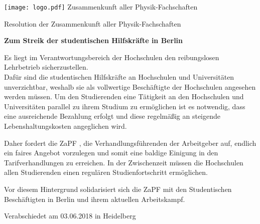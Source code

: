 \documentclass[DIV=calc]{scrartcl}
\begin{document}
    \hspace{0.87\textwidth}
    \begin{minipage}{120pt}
        \vspace{-1.8cm}
        \texttt{[image: logo.pdf]}
        \centering
        \small Zusammenkunft aller Physik-Fachschaften
    \end{minipage}
    \begin{center}
        \huge{Resolution der Zusammenkunft aller Physik-Fachschaften}\vspace{.25\baselineskip}\\
        \normalsize
    \end{center}
    \vspace{1cm} 
   \textbf{\large{Zum Streik der studentischen Hilfskräfte in Berlin}}
    

Es liegt im Verantwortungsbereich der Hochschulen den	reibungslosen
Lehrbetrieb	sicherzustellen.\\
Dafür sind die studentischen Hilfskräfte an	Hochschulen	und
Universitäten	unverzichtbar, weshalb sie als vollwertige Beschäftigte	der	Hochschulen	angesehen
werden	müssen.	Um	den	Studierenden	eine	Tätigkeit	an	den	Hochschulen	und	Universitäten	parallel
zu	ihrem	Studium	zu	ermöglichen	ist	es	notwendig,	dass	eine	ausreichende	Bezahlung	erfolgt	und
diese	regelmäßig	an	steigende	Lebenshaltungskosten	angeglichen	wird.

Daher	fordert	die	ZaPF , die Verhandlungsführenden der Arbeitgeber auf,	endlich	ein	faires	Angebot	vorzulegen	und	somit	eine
baldige	Einigung	in	den	Tarifverhandlungen	zu	erreichen.	In	der	Zwischenzeit	müssen	die
Hochschulen	allen	Studierenden	einen	regulären	Studienfortschritt	ermöglichen.

Vor	diesem	Hintergrund	solidarisiert	sich	die	ZaPF	mit	den	Studentischen	Beschäftigten	in	Berlin
und	ihrem	aktuellen	Arbeitskampf.


    \begin{flushright}
        Verabschiedet am 03.06.2018 in Heidelberg
    \end{flushright}
    
    
\end{document}
